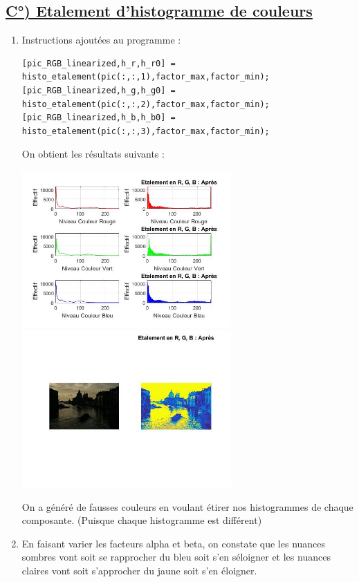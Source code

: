 \documentclass{article}
\begin{document}
\subsection*{\underline{C°) Etalement d’histogramme de couleurs}}
\begin{enumerate}[label=\arabic*$\degres$)]
	\lstset{numbers=left, frame=shadowbox} 
	\item Instructions ajoutées au programme :

\begin{lstlisting}
[pic_RGB_linearized,h_r,h_r0] = histo_etalement(pic(:,:,1),factor_max,factor_min);
[pic_RGB_linearized,h_g,h_g0] = histo_etalement(pic(:,:,2),factor_max,factor_min);
[pic_RGB_linearized,h_b,h_b0] = histo_etalement(pic(:,:,3),factor_max,factor_min);
\end{lstlisting}

On obtient les résultats suivants :

\includegraphics[width=8cm]{Venise_RGB_histo_etalement.jpg}
\includegraphics[width=8cm]{Venise_RGB_etalement.jpg}

On a généré de fausses couleurs en voulant étirer nos histogrammes de chaque composante. (Puisque chaque histogramme est différent)
	\item En faisant varier les facteurs alpha et beta, on constate que les nuances sombres vont soit se rapprocher du bleu soit s'en séloigner et les nuances claires vont soit s'approcher du jaune soit s'en éloigner.
\end{enumerate}
\end{document}
